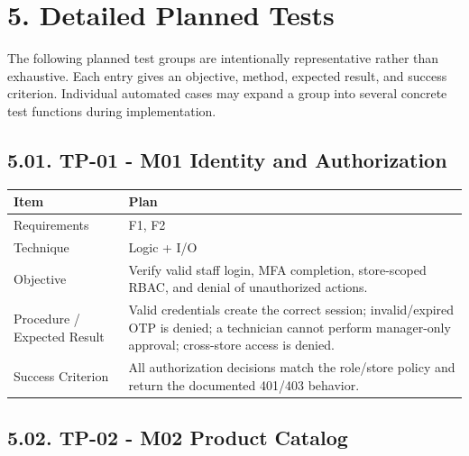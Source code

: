 \clearpage
\section{5. Detailed Planned Tests}\label{detailed-planned-tests}

The following planned test groups are intentionally representative rather than exhaustive. Each entry gives an objective, method, expected result, and success criterion. Individual automated cases may expand a group into several concrete test functions during implementation.

\subsection{5.01. TP-01 - M01 Identity and Authorization}\label{tp-01---m01-identity-and-authorization}

{\def\LTcaptype{none} %
\begin{longtable}[]{|
  >{\raggedright\arraybackslash}m{}|
  >{\raggedright\arraybackslash}m{}|}
\hline
\begin{minipage}[c]{\linewidth}\raggedright
\textbf{Item}
\end{minipage} & \begin{minipage}[c]{\linewidth}\raggedright
\textbf{Plan}
\end{minipage} \\
\hline
\endhead

\endlastfoot
Requirements & F1, F2 \\ \hline
Technique & Logic + I/O \\ \hline
Objective & Verify valid staff login, MFA completion, store-scoped RBAC, and denial of unauthorized actions. \\ \hline
Procedure / Expected Result & Valid credentials create the correct session; invalid/expired OTP is denied; a technician cannot perform manager-only approval; cross-store access is denied. \\ \hline
Success Criterion & All authorization decisions match the role/store policy and return the documented 401/403 behavior. \\ \hline
\end{longtable}
}

\subsection{5.02. TP-02 - M02 Product Catalog}\label{tp-02---m02-product-catalog}

